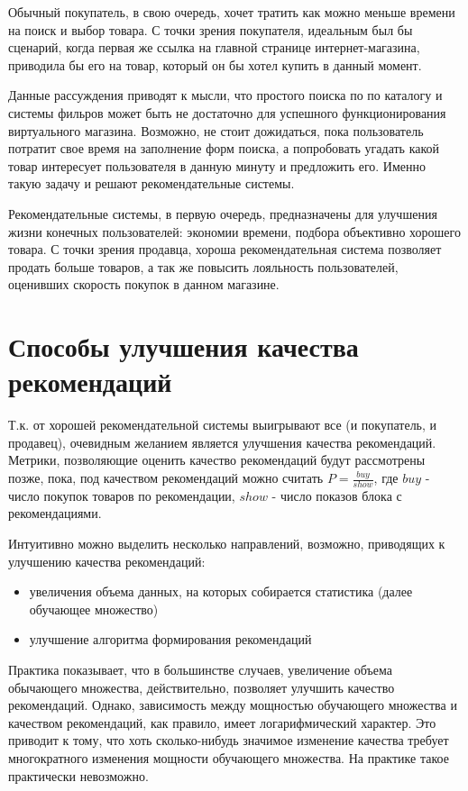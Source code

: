 \documentclass[12pt,a4paper]{report}
\begin{document}
Обычный покупатель, в свою очередь, хочет тратить как можно меньше времени на поиск и выбор товара. С точки зрения покупателя, идеальным был бы сценарий, когда первая же ссылка на главной странице интернет-магазина, приводила бы его на товар, который он бы хотел купить в данный момент.

Данные рассуждения приводят к мысли, что простого поиска по по каталогу и системы фильров может быть не достаточно для успешного функционирования виртуального магазина. Возможно, не стоит дожидаться, пока пользователь потратит свое время на заполнение форм поиска, а попробовать угадать какой товар интересует пользователя в данную минуту и предложить его. Именно такую задачу и решают рекомендательные системы.

Рекомендательные системы, в первую очередь, предназначены для улучшения жизни конечных пользователей: экономии времени, подбора объективно хорошего товара. С точки зрения продавца, хороша рекомендательная система позволяет продать больше товаров, а так же повысить лояльность пользователей, оценивших скорость покупок в данном магазине.

\section{Способы улучшения качества рекомендаций}
Т.к. от хорошей рекомендательной системы выигрывают все (и покупатель, и продавец), очевидным желанием является улучшения качества рекомендаций.
Метрики, позволяющие оценить качество рекомендаций будут рассмотрены позже, пока, под качеством рекомендаций можно считать $P=\frac{buy}{show}$, где $buy$ - число покупок товаров по рекомендации, $show$ - число показов блока с рекомендациями.

Интуитивно можно выделить несколько направлений, возможно, приводящих к улучшению качества рекомендаций:
\begin{itemize}
\item увеличения объема данных, на которых собирается статистика (далее обучающее множество)
\item улучшение алгоритма формирования рекомендаций
\end{itemize}
Практика показывает, что в большинстве случаев, увеличение объема обычающего множества, действительно, позволяет улучшить качество рекомендаций. Однако, зависимость между мощностью обучающего множества и качеством рекомендаций, как правило, имеет логарифмический характер. Это приводит к тому, что хоть сколько-нибудь значимое изменение качества требует многократного изменения мощности обучающего множества. На практике такое практически невозможно.
\end{document}
